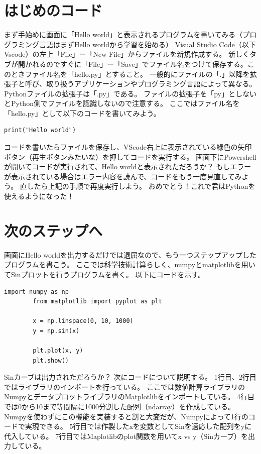 \documentclass[]{ltjsbook}
\begin{document}
	\section{はじめのコード}
	まず手始めに画面に「Hello world」と表示されるプログラムを書いてみる（プログラミング言語はまずHello worldから学習を始める）
	Visual Studio Code（以下Vscode）の左上「File」ー「New File」からファイルを新規作成する。
	新しくタブが開かれるのですぐに「File」ー「Save」でファイル名をつけて保存する。このときファイル名を「hello.py」とすること。
	一般的にファイルの「.」以降を拡張子と呼び、取り扱うアプリケーションやプログラミング言語によって異なる。
	Pythonファイルの拡張子は「.py」である。
	ファイルの拡張子を「py」としないとPython側でファイルを認識しないので注意する。
	ここではファイル名を「hello.py」として以下のコードを書いてみよう。

	\begin{lstlisting}[caption=hello.py,label=fuga]
		print("Hello world")
	\end{lstlisting}
	コードを書いたらファイルを保存し、VScode右上に表示されている緑色の矢印ボタン（再生ボタンみたいな）を押してコードを実行する。
	画面下にPowershellが開いてコードが実行されて、Hello worldと表示されただろうか？
	もしエラーが表示されている場合はエラー内容を読んで、コードをもう一度見直してみよう。
	直したら上記の手順で再度実行しよう。
	おめでとう！これで君はPythonを使えるようになった！

	\section{次のステップへ}
	画面にHello worldを出力するだけでは退屈なので、もう一つステップアップしたプログラムを書こう。
	ここでは科学技術計算らしく、numpyとmatplotlibを用いてSinプロットを行うプログラムを書く。
	以下にコードを示す。
	\begin{lstlisting}[caption=sin curve, label=sin]
		import numpy as np
		from matplotlib import pyplot as plt

		x = np.linspace(0, 10, 1000)
		y = np.sin(x)

		plt.plot(x, y)
		plt.show()

	\end{lstlisting}
	Sinカーブは出力されただろうか？
	次にコードについて説明する。
	1行目、2行目ではライブラリのインポートを行っている。
	ここでは数値計算ライブラリのNumpyとデータプロットライブラリのMatplotlibをインポートしている。
	4行目では0から10まで等間隔に1000分割した配列（ndarray）を作成している。
	Numpyを使わずにこの機能を実装すると割と大変だが、Numpyによって1行のコードで実現できる。
	5行目では作製したxを変数としてSinを適応した配列をyに代入している。
	7行目ではMaplotlibのplot関数を用いてx vs y（Sinカーブ）を出力している。
\end{document}
